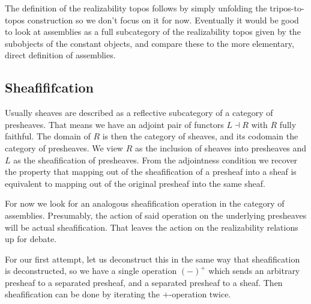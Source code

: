 \documentclass[11pt]{article}
\begin{document}
The definition of the realizability topos follows by simply
unfolding the tripos-to-topos construction so we don't focus on it for now.
%
Eventually it would be good to look at assemblies as a full subcategory of the
realizability topos given by the subobjects of the constant objects, and
compare these to the more elementary, direct definition of assemblies.

\subsection{Sheafififcation}

Usually sheaves are described as a reflective subcategory of a category
of presheaves.
%
That means we have an adjoint pair of functors \(L \dashv R\) with
\(R\) fully faithful.
%
The domain of \(R\) is then the category of sheaves, and its codomain the
category of presheaves.
%
We view \(R\) as the inclusion of sheaves into presheaves and \(L\)
as the sheafification of presheaves.
%
From the adjointness condition we recover the property that mapping out
of the sheafification of a presheaf into a sheaf is equivalent to mapping out
of the original presheaf into the same sheaf.

For now we look for an analogous sheafification operation in the category
of assemblies.
%
Presumably, the action of said operation on the underlying presheaves
will be actual sheafification.
%
That leaves the action on the realizability relations up for debate.

For our first attempt, let us deconstruct this in the same way that
sheafification is deconstructed, so we have a single operation
\({(-)}^{+}\) which sends an arbitrary presheaf to a separated presheaf,
and a separated presheaf to a sheaf.
%
Then sheafification can be done by iterating the \(+\)-operation twice.






\printbibliography{}
\end{document}
